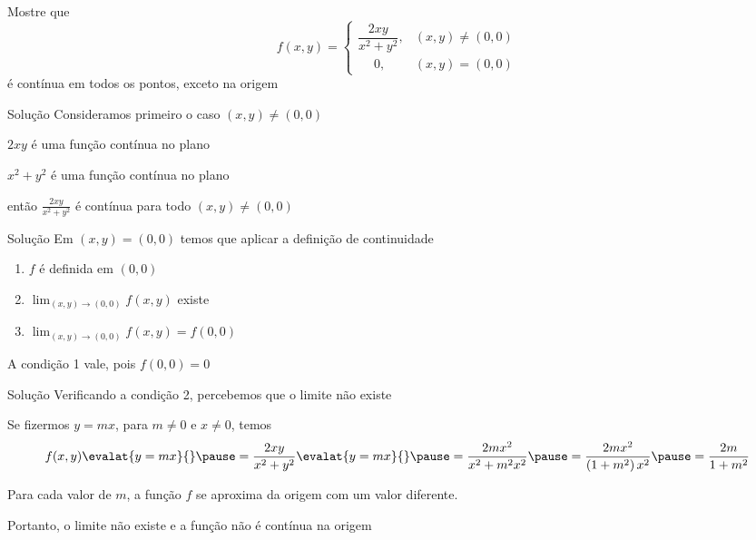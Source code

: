 \begin{question}
  Mostre que
  \[
    f(x, y) =
    \begin{cases}
      \dfrac{2xy}{x^2+y^2}, & (x, y) \neq (0, 0) \\
      \quad\; 0,            & (x, y) =    (0, 0)
    \end{cases}
  \]
  é contínua em todos os pontos, exceto na origem
\end{question}

\begin{resolution}{Solução}
  Consideramos primeiro o caso \((x, y) \neq (0, 0)\)

  \pause
  \vspace{\baselineskip}
  \(2xy\) é uma função contínua no plano

  \pause
  \(x^2+y^2\) é uma função contínua no plano

  \pause
  então \(\frac{2xy}{x^2+y^2}\)
  \pause
  é contínua para todo \((x, y) \neq (0, 0)\)
\end{resolution}

\begin{resolution}{Solução}
  Em \((x, y) = (0, 0)\) temos que aplicar a definição de continuidade

  \pause
  \vspace{0.5\baselineskip}
  \begin{enumerate}
    \setlength\itemsep{1.5em}
    \item \(f\) é definida em \((0, 0)\)
    \item \(\lim_{(x, y)\to(0, 0)} f(x, y)\) existe
    \item \(\lim_{(x, y)\to(0, 0)} f(x, y) = f(0, 0)\)
  \end{enumerate}

  \pause
  \vspace{\baselineskip}
  A condição 1 vale, pois \(f(0, 0) = 0\)
\end{resolution}

\begin{resolution}{Solução}
  Verificando a condição 2, percebemos que o limite não existe

  \pause
  Se fizermos \(y=mx\),
  \pause
  para \(m\neq 0\) e \(x\neq 0\), temos
  \pause
  \[
    f(x, y)\evalat{y=mx}{}
    \pause
    = \frac{2xy}{x^2+y^2}\evalat{y=mx}{}
    \pause
    = \frac{2mx^2}{x^2+m^2x^2}
    \pause
    = \frac{2mx^2}{\left(1+m^2\right)x^2}
    \pause
    = \frac{2m}{1+m^2}
  \]

  \pause
  Para cada valor de $m$, a função $f$ se aproxima da origem com um valor diferente.

  \pause
  Portanto, o limite não existe e a função não é contínua na origem
\end{resolution}

